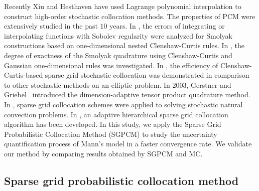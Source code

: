 Recently Xiu and Hesthaven \cite{DBJSH} have used Lagrange
polynomial interpolation to construct high-order stochastic
collocation methods. The properties of PCM were extensively studied
in the past $10$ years. In \cite{NOVAK96,NOVAK99,Barthelmann2000},
the errors of integrating or interpolating functions with Sobolev
regularity were analyzed for Smolyak constructions based on
one-dimensional nested Clenshaw-Curtis rules. In \cite{NOVAK99}, the
degree of exactness of the Smolyak quadrature using Clenshaw-Curtis
and Gaussian one-dimensional rules was investigated. In
\cite{DBJSH}, the efficiency of Clenshaw-Curtis-based sparse grid
stochastic collocation was demonstrated in comparison to other
stochastic methods on an elliptic problem. In 2003, Gerstner and
Griebel~\cite{Gerstner03} introduced the dimension-adaptive tensor
product quadrature method. In \cite{Ganapathysubramanian07}, sparse
grid collocation schemes were applied to solving stochastic natural
convection problems. In \cite{Griebel98,xmazabaras08}, an adaptive
hierarchical sparse grid collocation algorithm has been developed.
In this study, we apply the Sparse Grid Probabilistic Collocation
Method (SGPCM) to study the uncertainty quantification process of
Mann's model in a faster convergence rate. We validate our method by
comparing results obtained by SGPCM and MC.

\subsection*{Sparse grid probabilistic collocation method}

